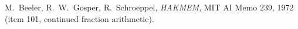  M.~Beeler, R.~W.~Gosper, R.~Schroeppel, \emph{HAKMEM}, MIT AI Memo 239, 1972 (item 101, continued fraction arithmetic).
